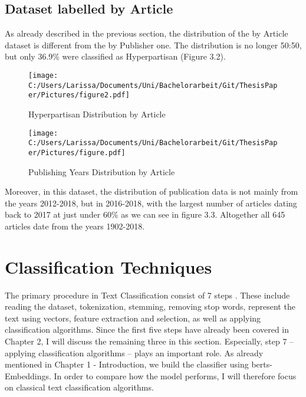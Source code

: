 \documentclass[a4paper, 11pt,titlepage,oneside,openany]{book}
\begin{document}
\section{Dataset labelled by Article}

As already described in the previous section, the distribution of the by Article dataset is different from the by Publisher one. The distribution is no longer 50:50, but only 36.9\% were classified as Hyperpartisan (Figure 3.2). 
\begin{figure}[t]
	\begin{minipage}{.45\linewidth}
		\texttt{[image: C:/Users/Larissa/Documents/Uni/Bachelorarbeit/Git/ThesisPaper/Pictures/figure2.pdf]}
		\caption{Hyperpartisan Distribution by Article}
	\end{minipage}
	\hspace{.1\linewidth}%
	\begin{minipage}{.45\linewidth}
	\texttt{[image: C:/Users/Larissa/Documents/Uni/Bachelorarbeit/Git/ThesisPaper/Pictures/figure.pdf]}
	\caption{Publishing Years Distribution by Article}
\end{minipage}
\end{figure}
\noindent Moreover, in this dataset, the distribution of publication data is not mainly from the years 2012-2018, but in 2016-2018, with the largest number of articles dating back to 2017 at just under 60\% as we can see in figure 3.3. Altogether all 645 articles date from the years 1902-2018.





\chapter{Classification Techniques}
The primary procedure in Text Classification consist of 7 steps \cite{textclassification}. These include  reading the dataset, tokenization, stemming, removing stop words, represent the text using vectors, feature extraction and selection, as well as applying classification algorithms. Since the first five steps have already been covered in Chapter 2, I will discuss the remaining three in this section. Especially, step 7 -- applying classification algorithms -- plays an important role. As already mentioned in Chapter 1 - Introduction, we build the classifier using \glspl{bert}-Embeddings. In order to compare how the model performs, I will therefore focus on classical text classification algorithms.
\end{document}
